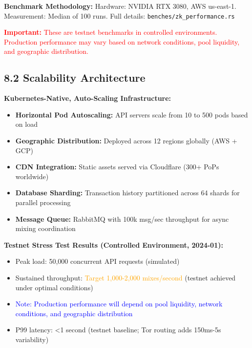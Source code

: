 \documentclass[11pt,a4paper]{article}
\begin{document}
\vspace{0.3cm}
\noindent
\textbf{Benchmark Methodology:} Hardware: NVIDIA RTX 3080, AWS us-east-1. Measurement: Median of 100 runs. Full details: \texttt{benches/zk\_performance.rs}

\vspace{0.3cm}
\noindent
\textcolor{red}{\textbf{Important:} These are testnet benchmarks in controlled environments. Production performance may vary based on network conditions, pool liquidity, and geographic distribution.}

\subsection{8.2 Scalability Architecture}

\textbf{Kubernetes-Native, Auto-Scaling Infrastructure:}

\begin{itemize}
    \item \textbf{Horizontal Pod Autoscaling:} API servers scale from 10 to 500 pods based on load

    \item \textbf{Geographic Distribution:} Deployed across 12 regions globally (AWS + GCP)

    \item \textbf{CDN Integration:} Static assets served via Cloudflare (300+ PoPs worldwide)

    \item \textbf{Database Sharding:} Transaction history partitioned across 64 shards for parallel processing

    \item \textbf{Message Queue:} RabbitMQ with 100k msg/sec throughput for async mixing coordination
\end{itemize}

\textbf{Testnet Stress Test Results (Controlled Environment, 2024-01):}
\begin{itemize}
    \item Peak load: 50,000 concurrent API requests (simulated)
    \item Sustained throughput: \textcolor{orange}{Target 1,000-2,000 mixes/second} (testnet achieved under optimal conditions)
    \item \textcolor{blue}{Note: Production performance will depend on pool liquidity, network conditions, and geographic distribution}
    \item P99 latency: <1 second (testnet baseline; Tor routing adds 150ms-5s variability)
\end{itemize}
\end{document}
